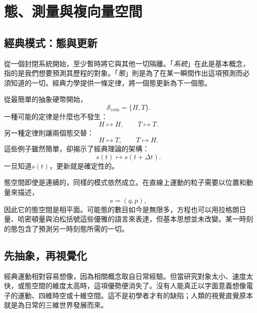 \chapter{態、測量與複向量空間}


\section{經典模式：態與更新}

從一個封閉系統開始，至少暫時將它與其他一切隔離。「\emph{系統}」在此是基本概念，指的是我們想要預測其歷程的對象。「\emph{態}」則是為了在某一瞬間作出這項預測而必須知道的一切。經典力學提供一條定律，將一個態更新為下一個態。

從最簡單的抽象硬幣開始，
\begin{equation}
  \mathcal S_{\mathrm{coin}}=\{H,T\}.
\end{equation}
一種可能的定律是什麼也不發生：
\begin{equation}
  H\longmapsto H,
  \qquad
  T\longmapsto T.
\end{equation}
另一種定律則讓兩個態交替：
\begin{equation}
  H\longmapsto T,
  \qquad
  T\longmapsto H.
\end{equation}
這些例子雖然簡單，卻揭示了經典理論的架構：
\begin{equation}
  s(t)\longmapsto s(t+\Delta t).
\end{equation}
一旦知道\(s(t)\)，更新就是確定性的。

態空間即使是連續的，同樣的模式依然成立。在直線上運動的粒子需要以位置和動量來描述，
\begin{equation}
  s=(q,p),
\end{equation}
因此它的態空間是相平面。可能態的數目如今是無限多，方程也可以用拉格朗日量、哈密頓量與泊松括號這些優雅的語言來表達，但基本思想並未改變。某一時刻的態包含了預測另一時刻態所需的一切。

\section{先抽象，再視覺化}

經典運動相對容易想像，因為相關概念取自日常經驗。但當研究對象太小、速度太快，或態空間的維度太高時，這項優勢便消失了。沒有人能真正以字面意義想像電子的運動、四維時空或十維空間。這不是初學者才有的缺陷；人類的視覺直覺原本就是為日常的三維世界發展而來。

